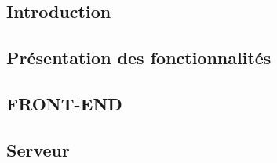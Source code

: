 

\subsection{Introduction}


\subsection{Présentation des fonctionnalités}


\subsection{FRONT-END}


\subsection{Serveur}


%

%
